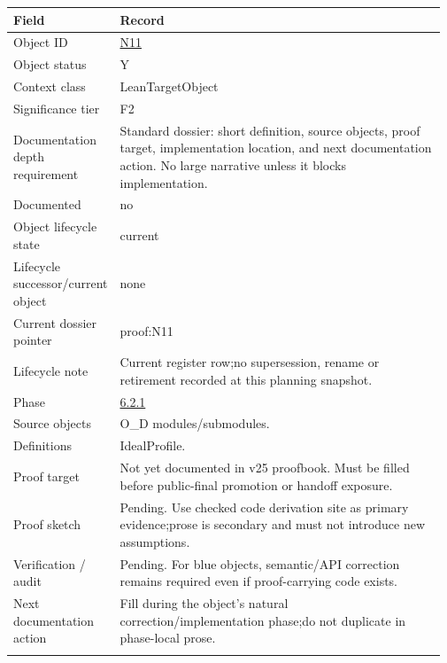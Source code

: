 \begin{longtable}{L{0.16\linewidth} L{0.81\linewidth}}
\hline
\textbf{Field} & \textbf{Record}\\
\hline
Object ID & \hyperlink{object-row-N11}{N11}\\
\hline\addlinespace[0.20em]
Object status & Y\\
\hline\addlinespace[0.20em]
Context class & LeanTargetObject\\
\hline\addlinespace[0.20em]
Significance tier & F2\\
\hline\addlinespace[0.20em]
Documentation depth requirement & Standard dossier: short definition, source objects, proof target, implementation location, and next documentation action. No large narrative unless it blocks implementation.\\
\hline\addlinespace[0.20em]
Documented & no\\
\hline\addlinespace[0.20em]
Object lifecycle state & current\\
\hline\addlinespace[0.20em]
Lifecycle successor/\allowbreak{}current object & none\\
\hline\addlinespace[0.20em]
Current dossier pointer & proof:N11\\
\hline\addlinespace[0.20em]
Lifecycle note & Current register row;\newline no supersession, rename or retirement recorded at this planning snapshot.\\
\hline\addlinespace[0.20em]
Phase & \hyperlink{phase-row-6-2-1}{6.2.1}\\
\hline\addlinespace[0.20em]
Source objects & O\_D modules/\allowbreak{}submodules.\\
\hline\addlinespace[0.20em]
Definitions & IdealProfile.\\
\hline\addlinespace[0.20em]
Proof target & Not yet documented in v25 proofbook. Must be filled before public-final promotion or handoff exposure.\\
\hline\addlinespace[0.20em]
Proof sketch & Pending. Use checked code derivation site as primary evidence;\newline prose is secondary and must not introduce new assumptions.\\
\hline\addlinespace[0.20em]
Verification /\allowbreak{} audit & Pending. For blue objects, semantic/\allowbreak{}API correction remains required even if proof-carrying code exists.\\
\hline\addlinespace[0.20em]
Next documentation action & Fill during the object's natural correction/\allowbreak{}implementation phase;\newline do not duplicate in phase-local prose.\\
\hline\addlinespace[0.20em]
\end{longtable}
